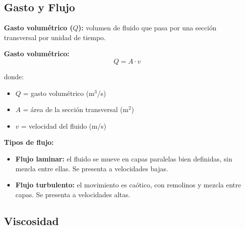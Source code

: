 \subsection{Gasto y Flujo}

\begin{seccion}

\begin{definicion}
\textbf{Gasto volumétrico ($Q$):} volumen de fluido que pasa por una sección transversal por unidad de tiempo.
\end{definicion}

\begin{ecuacion}
\textbf{Gasto volumétrico:}
$$Q = A \cdot v$$

donde:
\begin{itemize}
    \item $Q$ = gasto volumétrico (m$^3$/s)
    \item $A$ = área de la sección transversal (m$^2$)
    \item $v$ = velocidad del fluido (m/s)
\end{itemize}
\end{ecuacion}

\textbf{Tipos de flujo:}
\begin{itemize}
    \item \textbf{Flujo laminar:} el fluido se mueve en capas paralelas bien definidas, sin mezcla entre ellas. Se presenta a velocidades bajas.
    \item \textbf{Flujo turbulento:} el movimiento es caótico, con remolinos y mezcla entre capas. Se presenta a velocidades altas.
\end{itemize}

\end{seccion}

\subsection{Viscosidad}

